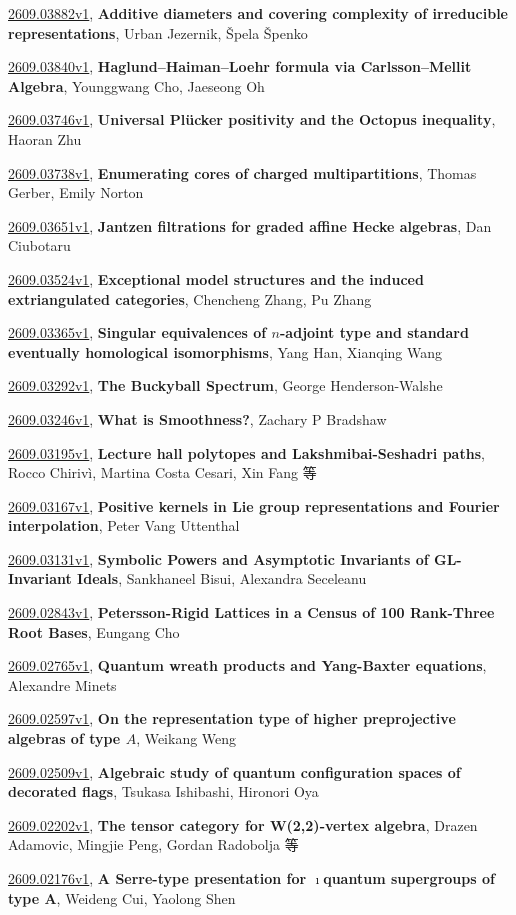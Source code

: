 \documentclass[9pt, a4paper]{article}
\theoremstyle{plain}
\theoremstyle{definition}
\theoremstyle{remark}
\newcommand{\arxiv}[3]{\href{https://arxiv.org/abs/#1}{#1}, \textbf{\textcolor{arxivblue}{#2}}, #3}
\begin{document}
\arxiv{2609.03882v1}{Additive diameters and covering complexity of irreducible representations}{Urban Jezernik, Špela Špenko}

\arxiv{2609.03840v1}{Haglund--Haiman--Loehr formula via Carlsson--Mellit Algebra}{Younggwang Cho, Jaeseong Oh}

\arxiv{2609.03746v1}{Universal Plücker positivity and the Octopus inequality}{Haoran Zhu}

\arxiv{2609.03738v1}{Enumerating cores of charged multipartitions}{Thomas Gerber, Emily Norton}

\arxiv{2609.03651v1}{Jantzen filtrations for graded affine Hecke algebras}{Dan Ciubotaru}

\arxiv{2609.03524v1}{Exceptional model structures and the induced extriangulated categories}{Chencheng Zhang, Pu Zhang}

\arxiv{2609.03365v1}{Singular equivalences of $n$-adjoint type and standard eventually homological isomorphisms}{Yang Han, Xianqing Wang}

\arxiv{2609.03292v1}{The Buckyball Spectrum}{George Henderson-Walshe}

\arxiv{2609.03246v1}{What is Smoothness?}{Zachary P Bradshaw}

\arxiv{2609.03195v1}{Lecture hall polytopes and Lakshmibai-Seshadri paths}{Rocco Chirivì, Martina Costa Cesari, Xin Fang 等}

\arxiv{2609.03167v1}{Positive kernels in Lie group representations and Fourier interpolation}{Peter Vang Uttenthal}

\arxiv{2609.03131v1}{Symbolic Powers and Asymptotic Invariants of GL-Invariant Ideals}{Sankhaneel Bisui, Alexandra Seceleanu}

\arxiv{2609.02843v1}{Petersson-Rigid Lattices in a Census of 100 Rank-Three Root Bases}{Eungang Cho}

\arxiv{2609.02765v1}{Quantum wreath products and Yang-Baxter equations}{Alexandre Minets}

\arxiv{2609.02597v1}{On the representation type of higher preprojective algebras of type $A$}{Weikang Weng}

\arxiv{2609.02509v1}{Algebraic study of quantum configuration spaces of decorated flags}{Tsukasa Ishibashi, Hironori Oya}

\arxiv{2609.02202v1}{The tensor category for W(2,2)-vertex algebra}{Drazen Adamovic, Mingjie Peng, Gordan Radobolja 等}

\arxiv{2609.02176v1}{A Serre-type presentation for $\imath$quantum supergroups of type A}{Weideng Cui, Yaolong Shen}
\end{document}
